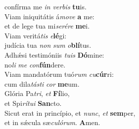 \evenverse confírma me \textit{in} \textit{ver}\textit{bis} \textbf{tu}is.\\
\oddverse Viam iniquitátis á\textit{mo}\textit{ve} \textbf{a} me:~\*\\
\oddverse et de lege tua mi\textit{se}\textit{ré}\textit{re} \textbf{me}i.\\
\evenverse Viam veritá\textit{tis} \textit{e}\textbf{lé}gi:~\*\\
\evenverse judícia tua \textit{non} \textit{sum} \textit{o}\textbf{blí}tus.\\
\oddverse Adhǽsi testimóniis \textit{tu}\textit{is} \textbf{Dó}mine:~\*\\
\oddverse no\textit{li} \textit{me} \textit{con}\textbf{fún}dere.\\
\evenverse Viam mandatórum tuó\textit{rum} \textit{cu}\textbf{cúr}ri:~\*\\
\evenverse cum dila\textit{tá}\textit{sti} \textit{cor} \textbf{me}um.\\
\oddverse Glória Pa\textit{tri}, \textit{et} \textbf{Fí}lio,~\*\\
\oddverse et Spi\textit{rí}\textit{tu}\textit{i} \textbf{San}cto.\\
\evenverse Sicut erat in princípio, et \textit{nunc}, \textit{et} \textbf{sem}per,~\*\\
\evenverse et in sǽcula sæ\textit{cu}\textit{ló}\textit{rum}. \textbf{A}men.\\
